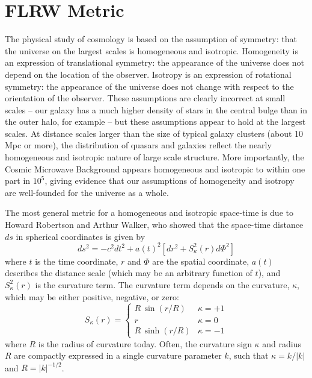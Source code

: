 \section{FLRW Metric}
\label{sec:FLRW}
The physical study of cosmology is based on the assumption of symmetry:
that the universe on the largest scales is homogeneous and isotropic.
Homogeneity is an expression of translational symmetry: the appearance of
the universe does not depend on the location of the observer.  Isotropy
is an expression of rotational symmetry: the appearance of the universe
does not change with respect to the orientation of the observer.
These assumptions are clearly incorrect at small scales -- our galaxy
has a much higher density of stars in the central bulge than in the
outer halo, for example -- but these assumptions appear to hold at
the largest scales.  At distance scales larger than the size of
typical galaxy clusters (about 10 Mpc or more), the distribution of
quasars and galaxies reflect the nearly homogeneous and isotropic
nature of large scale structure.  More importantly, the Cosmic Microwave
Background appears homogeneous and isotropic to within one part in
$10^5$, giving evidence that our assumptions of homogeneity and isotropy
are well-founded for the universe as a whole.

The most general metric for a homogeneous and isotropic space-time is due
to Howard Robertson and Arthur Walker, who showed that the space-time
distance $ds$ in spherical coordinates is given by
\begin{equation}
  \label{eq:FLRW_metric}
  ds^2 = -c^2 dt^2 + a(t)^2\left[dr^2 + S_\kappa^2(r)d\Phi^2\right]
\end{equation}
where $t$ is the time coordinate, $r$ and $\Phi$ are the spatial coordinate,
$a(t)$ describes the distance scale (which may be an arbitrary function
of $t$), and $S_\kappa^2(r)$ is the curvature term.  The curvature term
depends on the curvature, $\kappa$, which may be either positive, negative,
or zero:
\begin{equation}
  \label{eq:FLRW_curvature}
  S_\kappa(r) = \left\{
  \begin{array}{ll}
    R\,\sin(r/R) & \kappa = +1\\
    r & \kappa = 0\\
    R\,\sinh(r/R) & \kappa = -1
  \end{array}
  \right.
\end{equation}
where $R$ is the radius of curvature today.  Often, the curvature
sign $\kappa$ and radius $R$ are compactly expressed in a single curvature
parameter $k$, such that $\kappa = k/|k|$ and $R = |k|^{-1/2}$.

